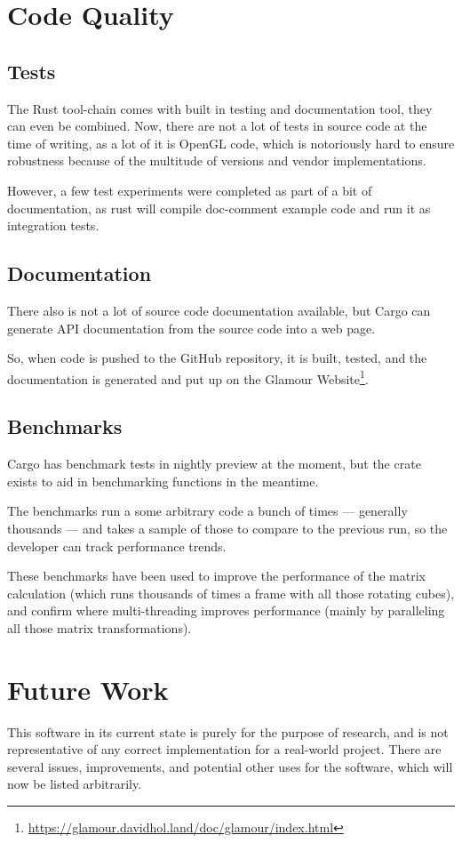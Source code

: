 \section{Code Quality}

\subsection{Tests}
The Rust tool-chain comes with built in testing and documentation tool, they can even be combined.
Now, there are not a lot of tests in source code at the time of writing, as a lot of it is OpenGL code, which is notoriously hard to ensure robustness because of the multitude of versions and vendor implementations.

However, a few test experiments were completed as part of a bit of documentation, as rust will compile doc-comment example code and run it as integration tests.

\subsection{Documentation}
There also is not a lot of source code documentation available, but Cargo can generate API documentation from the source code into a web page.

So, when code is pushed to the GitHub repository, it is built, tested, and the documentation is generated and put up on the Glamour Website\footnote{\url{https://glamour.davidhol.land/doc/glamour/index.html}}.

\subsection{Benchmarks}
Cargo has benchmark tests in nightly preview at the moment, but the  crate exists to aid in benchmarking functions in the meantime.

The benchmarks run a some arbitrary code a bunch of times — generally thousands — and takes a sample of those to compare to the previous run, so the developer can track performance trends.

These benchmarks have been used to improve the performance of the  matrix calculation (which runs thousands of times a frame with all those rotating cubes), and confirm where multi-threading improves performance (mainly by paralleling all those matrix transformations).

\section{Future Work}
This software in its current state is purely for the purpose of research, and is not representative of any correct implementation for a real-world project.
There are several issues, improvements, and potential other uses for the software, which will now be listed arbitrarily.


